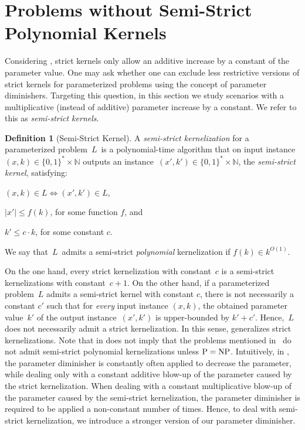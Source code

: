 \documentclass[11pt,a4,USenglish]{article}
\newcommand{\NP}{\textnormal{NP}}
\newcommand{\PTIME}{\textnormal{P}}
\newcommand{\PeqNP}{$\PTIME{}=\NP{}$}
\theoremstyle{definition}
\newtheorem{defi}{Definition}
\theoremstyle{plain}
\theoremstyle{remark}
\newcommand{\appendixsection}[1]{%
%
}
\begin{document}
%
%
%
%
%
%
%


\section{Problems without Semi-Strict Polynomial Kernels}
\label{sec:nodiminishers}
\appendixsection{sec:nodiminishers}


%
%
%
%
%
%
%
%
%
%
%
%
%
%
%
%
%
%
%
%
%
%
%
%
%
%
%
%
%
%

Considering , strict kernels only allow an additive increase by a constant of the parameter value.
One may ask whether one can exclude less restrictive versions of strict kernels for parameterized problems using the concept of parameter diminishers.
Targeting this question, in this section we study scenarios with a multiplicative (instead of additive) parameter increase by a constant. We refer to this as \emph{semi-strict kernels}.

\begin{defi}[Semi-Strict Kernel]
\label{def:lessstrictPK}
A \emph{semi-strict kernelization} for a parameterized problem~$L$~is a polynomial-time algorithm that on input instance $(x,k)\in \{0,1\}^* \times \mathbb{N}$ outputs an instance~$(x',k')\in \{0,1\}^* \times \mathbb{N}$, the \emph{semi-strict kernel}, satisfying:
%
%
\begin{inparaenum}[(i)]
\item $(x, k) \in L \iff (x', k') \in L$,
\item $|x'| \le f(k)$, for some function $f$, and
\item $k' \le c\cdot k $, for some constant $c$.
\end{inparaenum}
%
%
We say that~$L$~admits a semi-strict \emph{polynomial} kernelization if $f(k)\in k^{O(1)}$.
%
\end{defi}
%
\iflong{}
  On the one hand, every strict kernelization with constant~$c$ is a semi-strict kernelizations with constant~$c+1$.
  On the other hand, if a parameterized problem~$L$ admits a semi-strict kernel with constant $c$, there is not necessarily a constant $c'$ such that for \emph{every} input instance $(x,k)$, the obtained parameter value~$k'$ of the output instance~$(x',k')$ is upper-bounded by $k'+c'$.
  Hence,~$L$ does not necessarily admit a strict kernelization.
  In this sense,  generalizes strict kernelizations.
\fi{}
%
Note that  in  does not imply that the problems mentioned in~ do not admit semi-strict polynomial kernelizations unless \PeqNP{}.
Intuitively, in , the parameter diminisher is constantly often applied to decrease the parameter, while dealing only with a constant additive blow-up of the parameter caused by the strict kernelization.
When dealing with a constant multiplicative blow-up of the parameter caused by the semi-strict kernelization, the parameter diminisher is required to be applied a non-constant number of times.
Hence, to deal with semi-strict kernelization, we introduce a stronger version of our parameter diminisher.
\end{document}
